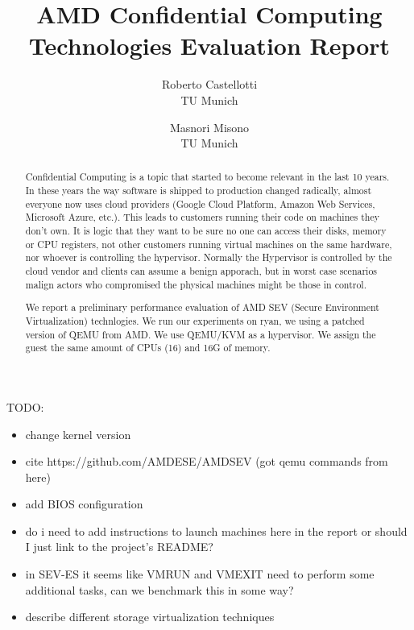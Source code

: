 \documentclass[twocolumn]{article}
\begin{document}
\date{}
\title{\Large \bf AMD Confidential Computing Technologies Evaluation Report}
\author{{\rm Roberto Castellotti}\\TU Munich \and {\rm Masnori Misono}\\TU Munich}
\maketitle

TODO:
\begin{itemize}
    \item change kernel version
    \item cite https://github.com/AMDESE/AMDSEV (got qemu commands from here)
    \item add BIOS configuration
    \item do i need to add instructions to launch machines here in the report or should I just link to the project's README?
    \item in SEV-ES it seems like VMRUN and VMEXIT need to perform some additional tasks, can we benchmark this in some way?
    \item describe different storage virtualization techniques
\end{itemize}

\begin{abstract}
    Confidential Computing is a topic that started to become relevant in the last 10 years. In these years the way software is shipped to production changed radically, almost everyone now uses cloud providers (Google Cloud Platform, Amazon Web Services, Microsoft Azure, etc.). This leads to customers running their code on machines they don't own. It is logic that they want to be sure no one can access their disks, memory or CPU registers, not other customers running virtual machines on the same hardware, nor whoever is controlling the hypervisor. Normally the Hypervisor is controlled by the cloud vendor and clients can assume a benign apporach, but in worst case scenarios malign actors who compromised the physical machines might be those in control.
    \par
    We report a preliminary performance evaluation of AMD SEV (Secure Environment Virtualization) technlogies.
    We run our experiments on ryan, we using a patched version of QEMU from AMD. We use QEMU/KVM as a hypervisor. We assign the guest the same amount of CPUs (16) and 16G of memory.    
\end{abstract}
\end{document}
